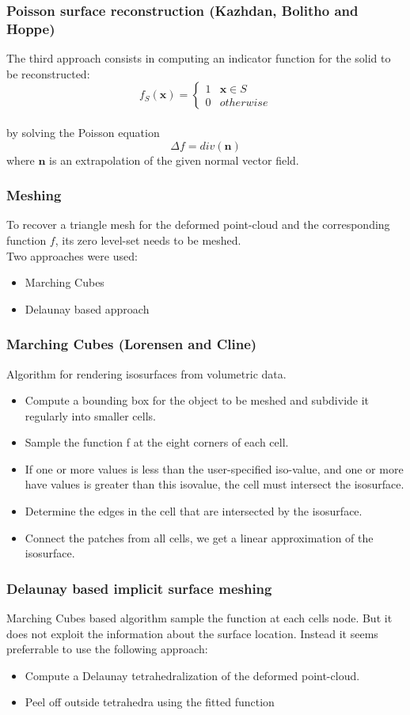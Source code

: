\documentclass{beamer}
\def\x{\mathbf{x}}
\def\n{\mathbf{n}}
\begin{document}
\begin{frame}
	\frametitle{Poisson surface reconstruction (Kazhdan, Bolitho and Hoppe)}
\Large
The third approach consists in computing an indicator function for the solid 
to be reconstructed:
\[
f_S (\x)= \left\{ \begin{array}{ll} 1 & \x \in S\\ 
0 & otherwise \end{array}\right.
\]\\
by solving the Poisson equation
\[
\Delta f=div(\n)
\]
where $\n$ is an extrapolation of the given normal vector field.
\end{frame}


\begin{frame} 
\frametitle{Meshing}
\Large
To recover a triangle mesh for the deformed point-cloud and the corresponding function $f$,
its zero level-set needs to be meshed.
\\
Two approaches were used:
\begin{itemize}
\item Marching Cubes
\item Delaunay based approach
\end{itemize}
\end{frame}


\begin{frame}
\frametitle{Marching Cubes (Lorensen and Cline)}
Algorithm for rendering isosurfaces from volumetric data. \\
\begin{itemize}
\item Compute a bounding box for the object to be meshed and subdivide it regularly into smaller cells. 
\item Sample the function f at the eight corners of each cell.
\item If one or more values is less than the user-specified iso-value, and one or more have values is greater than this isovalue, the cell must intersect the isosurface.
\item Determine the edges in the cell that are intersected by the isosurface.
\item Connect the patches from all cells, we get a linear approximation of the isosurface.
\end{itemize}
\end{frame}


\begin {frame}
\frametitle{Delaunay based implicit surface meshing}
\Large
Marching Cubes based algorithm sample the function at each cells node. 
But it does not exploit the information about the surface location. Instead 
it seems preferrable to use the following approach:
\begin{itemize}
\item Compute a Delaunay tetrahedralization of the deformed point-cloud.\\
\item Peel off outside tetrahedra using the fitted function\\
\end{itemize}
\end{frame}
\end{document}
